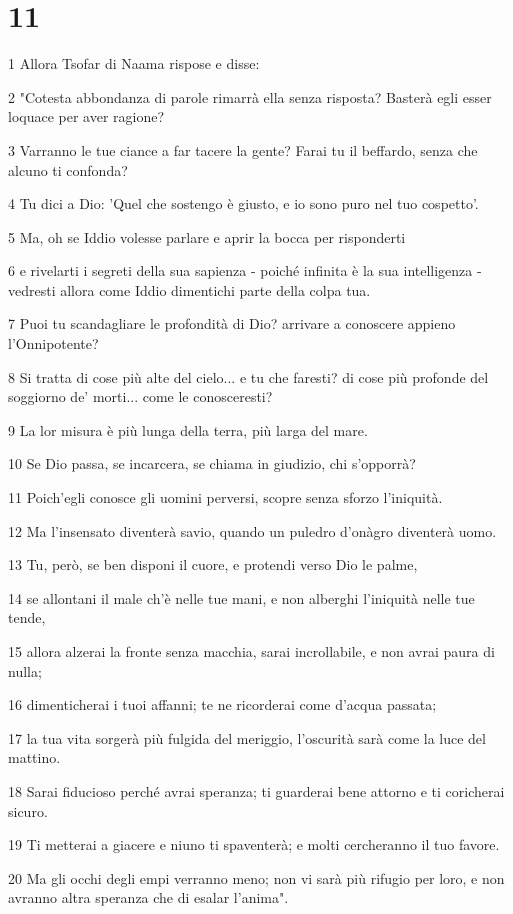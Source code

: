 \chapter{11}

\par 1 Allora Tsofar di Naama rispose e disse:
\par 2 "Cotesta abbondanza di parole rimarrà ella senza risposta? Basterà egli esser loquace per aver ragione?
\par 3 Varranno le tue ciance a far tacere la gente? Farai tu il beffardo, senza che alcuno ti confonda?
\par 4 Tu dici a Dio: 'Quel che sostengo è giusto, e io sono puro nel tuo cospetto'.
\par 5 Ma, oh se Iddio volesse parlare e aprir la bocca per risponderti
\par 6 e rivelarti i segreti della sua sapienza - poiché infinita è la sua intelligenza - vedresti allora come Iddio dimentichi parte della colpa tua.
\par 7 Puoi tu scandagliare le profondità di Dio? arrivare a conoscere appieno l'Onnipotente?
\par 8 Si tratta di cose più alte del cielo... e tu che faresti? di cose più profonde del soggiorno de' morti... come le conosceresti?
\par 9 La lor misura è più lunga della terra, più larga del mare.
\par 10 Se Dio passa, se incarcera, se chiama in giudizio, chi s'opporrà?
\par 11 Poich'egli conosce gli uomini perversi, scopre senza sforzo l'iniquità.
\par 12 Ma l'insensato diventerà savio, quando un puledro d'onàgro diventerà uomo.
\par 13 Tu, però, se ben disponi il cuore, e protendi verso Dio le palme,
\par 14 se allontani il male ch'è nelle tue mani, e non alberghi l'iniquità nelle tue tende,
\par 15 allora alzerai la fronte senza macchia, sarai incrollabile, e non avrai paura di nulla;
\par 16 dimenticherai i tuoi affanni; te ne ricorderai come d'acqua passata;
\par 17 la tua vita sorgerà più fulgida del meriggio, l'oscurità sarà come la luce del mattino.
\par 18 Sarai fiducioso perché avrai speranza; ti guarderai bene attorno e ti coricherai sicuro.
\par 19 Ti metterai a giacere e niuno ti spaventerà; e molti cercheranno il tuo favore.
\par 20 Ma gli occhi degli empi verranno meno; non vi sarà più rifugio per loro, e non avranno altra speranza che di esalar l'anima".

